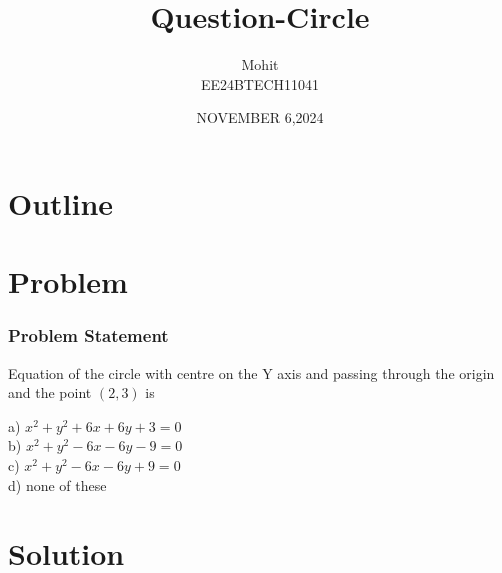 \documentclass{beamer}
\title{Question-Circle}
\author{Mohit \\ EE24BTECH11041}
\date{NOVEMBER 6,2024}
\providecommand{\brak}[1]{\ensuremath{\left(#1\right)}}
\theoremstyle{remark}
\numberwithin{equation}{section}
\begin{document}
\begin{frame}
\titlepage
\end{frame}

\section*{Outline}
\begin{frame}
\tableofcontents
\end{frame}
\section{Problem}
\begin{frame}
\frametitle{Problem Statement}
%
Equation of the circle with centre on the Y axis and passing through the origin and the point $\brak{2, 3}$ is

a) $x^2 + y^2 + 6x + 6y + 3 = 0$\\
b) $x^2 + y^2 - 6x - 6y - 9 = 0$\\
c) $x^2 + y^2 - 6x - 6y + 9 = 0$\\
d) none of these



\end{frame}

\section{Solution}
\end{document}
